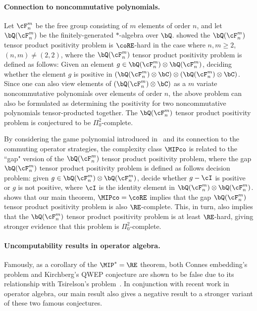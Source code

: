 \paragraph{Connection to noncommutative polynomials. } Let $\cF_n^m$ be the free group consisting of $m$ elements of order $n$, and let $\bQ(\cF_n^m)$ be the finitely-generated $*$-algebra over $\bQ$. \cite[Theorem 1.1]{mehtaPositivityUndecidableTensor2023} showed the $\bQ(\cF_n^m)$ tensor product positivity problem is $\coRE$-hard in the case where $n,m \geq 2$, $(n,m) \neq (2,2)$, where the $\bQ(\cF_n^m)$ tensor product positivity problem is defined as follows: Given an element $g \in \bQ(\cF_n^m) \otimes \bQ(\cF_n^m)$, deciding whether the element $g$ is positive in $(\bQ(\cF_n^m) \otimes \bC) \otimes (\bQ(\cF_n^m)\otimes \bC)$. Since one can also view elements of $(\bQ(\cF_n^m)\otimes \bC)$ as a $m$ variate noncommutative polynomials over elements of order $n$, the above problem can also be formulated as determining the positivity for two noncommutative polynomials tensor-producted together. The $\bQ(\cF_n^m)$ tensor product positivity problem is conjectured to be $\Pi^2_0$-complete. 

By considering the game polynomial introduced in~\cite{wattsNoncommutativeNullstellensatzePerfect2023} and its connection to the commuting operator strategies, the complexity class $\MIPco$ is related to the ``gap" version of the $\bQ(\cF_n^m)$ tensor product positivity problem, where the gap $\bQ(\cF_n^m)$ tensor product positivity problem is defined as follows decision problem: given $g \in \bQ(\cF_n^m) \otimes \bQ(\cF_n^m)$, decide whether $g - \cI$ is positive or $g$ is not positive, where $\cI$ is the identity element in $\bQ(\cF_n^m) \otimes \bQ(\cF_n^m)$. \cite{mehtaPositivityUndecidableTensor2023} shows that our main theorem, $\MIPco=\coRE$ implies that the gap $\bQ(\cF_n^m)$ tensor product positivity problem is also $\RE$-complete. This, in turn, also implies that the $\bQ(\cF_n^m)$ tensor product positivity problem is at least $\RE$-hard, giving stronger evidence that this problem is $\Pi^2_0$-complete. 

\paragraph{Uncomputability results in operator algebra. } Famously, as a corollary of the $\MIP^*=\RE$ theorem, both Connes embedding's problem and Kirchberg's QWEP conjecture are shown to be false due to its relationship with Tsirelson's problem~\cite{fritzTsirelsonProblemKirchberg2012,ozawaQWEPConjecture2004}. In conjunction with recent work in operator algebra, our main result also gives a negative result to a stronger variant of these two famous conjectures. 

